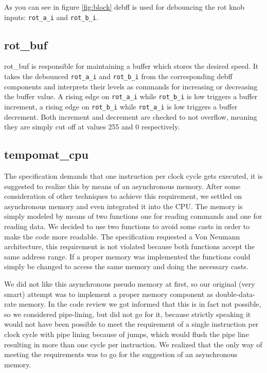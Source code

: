 \documentclass[a4paper,10pt]{scrartcl}
\begin{document}
As you can see in figure \ref{fig:block} debff is used for debouncing the rot knob inputs: \texttt{rot\_a\_i} and \texttt{rot\_b\_i}.

\subsection{rot\_buf}
\label{sec:rot_buf}

rot\_buf is responsible for maintaining a buffer which stores the
desired speed. It takes the debounced \texttt{rot\_a\_i} and
\texttt{rot\_b\_i} from the corresponding debff components and
interprets their levels as commands for increasing or decreasing the
buffer value. A rising edge on \texttt{rot\_a\_i} while
\texttt{rot\_b\_i} is low triggers a buffer increment, a rising edge on
\texttt{rot\_b\_i} while \texttt{rot\_a\_i} is low triggers a buffer
decrement. Both increment and decrement are checked to not overflow,
meaning they are simply cut off at values 255 and 0 respectively.

\subsection{tempomat\_cpu}
\label{sec:tempomat_cpu}
The specification demands that one instruction per clock cycle gets
executed, it is suggested to realize this by means of an asynchronous
memory. After some consideration of other techniques to achieve this
requirement, we settled on asynchronous memory and even integrated it
into the CPU. The memory is simply modeled by means of two functions
one for reading commands and one for reading data. We decided to use
two functions to avoid some casts in order to make the code more
readable. The specification requested a Von Neumann architecture, this
requirement is not violated because both functions accept the same
address range. If a proper memory was implemented the functions could
simply be changed to access the same memory and doing the necessary
casts.

We did not like this asynchronous pseudo memory at first, so our
original (very smart) attempt was to implement a proper memory component
as double-data-rate memory. In the code review we got informed that
this is in fact not possible, so we considered pipe-lining, but did
not go for it, because strictly speaking it would not have been
possible to meet the requirement of a single instruction per clock
cycle with pipe lining because of jumps, which would flush the pipe
line resulting in more than one cycle per instruction. We realized
that the only way of meeting the requirements was to go for the
suggestion of an asynchronous memory.
\end{document}
